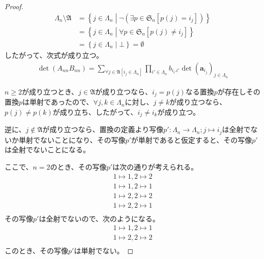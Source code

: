 \documentclass[dvipdfmx]{jsarticle}
\begin{document}
\begin{proof}
\begin{align*}
\varLambda_{n}\mathfrak{\setminus A} &= \left\{ j \in \varLambda_{n} \middle| \neg\left( \exists p \in \mathfrak{S}_{n}\left[ p(j) = i_{j} \right] \right) \right\}\\
&= \left\{ j \in \varLambda_{n} \middle| \forall p \in \mathfrak{S}_{n}\left[ p(j) \neq i_{j} \right] \right\}\\
&= \left\{ j \in \varLambda_{n} \middle| \bot \right\} = \emptyset
\end{align*}
したがって、次式が成り立つ。
\begin{align*}
\det\left( A_{nn}B_{nn} \right) = \sum_{\forall j \in \mathfrak{A}\left[ i_{j} \in \varLambda_{n} \right]} {\prod_{i' \in \varLambda_{n}} b_{i_{i'}i'}\det\left( \mathbf{a}_{i_{j}} \right)_{j \in \varLambda_{n}}}
\end{align*}\par
$n \geq 2$が成り立つとき、$j \in \mathfrak{A}$が成り立つなら、$i_{j} = p(j)$なる置換$p$が存在しその置換$p$は単射であったので、$\forall j,k \in \varLambda_{n}$に対し、$j \neq k$が成り立つなら、$p(j) \neq p(k)$が成り立ち、したがって、$i_{j} \neq i_{k}$が成り立つ。\par
逆に、$j \notin \mathfrak{A}$が成り立つなら、置換の定義より写像$p':\varLambda_{n} \rightarrow \varLambda_{n};j \mapsto i_{j}$は全射でないか単射でないことになり、その写像$p'$が単射であると仮定すると、その写像$p'$は全射でないことになる。\par
ここで、$n = 2$のとき、その写像$p'$は次の通りが考えられる。
\begin{align*}
1 \mapsto 1,2 \mapsto 2 \\
1 \mapsto 1,2 \mapsto 1 \\
1 \mapsto 2,2 \mapsto 2 \\
1 \mapsto 2,2 \mapsto 1 \\
\end{align*}
その写像$p'$は全射でないので、次のようになる。
\begin{align*}
1 \mapsto 1,2 \mapsto 1 \\
1 \mapsto 2,2 \mapsto 2 \\
\end{align*}
このとき、その写像$p'$は単射でない。\par

\end{proof}
\end{document}
